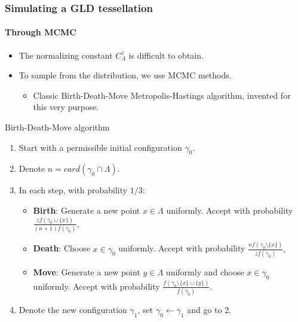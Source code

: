 \documentclass[c, 10pt]{beamer}
\begin{document}
\begin{frame}\frametitle{Simulating a GLD tessellation}\framesubtitle{Through MCMC}

\begin{small}
\begin{itemize}
    \item The normalizing constant $C^{z}_\Lambda$ is difficult to obtain.
    \item To sample from the distribution, we use MCMC methods.
    \begin{itemize}
        \item Classic Birth-Death-Move Metropolis-Hastings algorithm, invented for this very purpose.
    \end{itemize} 
\end{itemize}


Birth-Death-Move algorithm
\begin{enumerate}
    \item Start with a permissible initial configuration $\gamma_0$. 
    \item Denote $n=card(\gamma_0\cap \Lambda)$.
    \item In each step, with probability $1/3$:
    \begin{itemize}
        \item \textbf{Birth}: Generate a new point $x \in \Lambda$ uniformly. Accept with probability  $ \frac{z f(\gamma_0 \cup \{x\})}{(n+1)f(\gamma_0)},$
        \item \textbf{Death}: Choose $x\in\gamma_0$ uniformly. Accept with probability $ \frac{n f(\gamma_0 \setminus \{x\})}{zf(\gamma_0)},$
        \item \textbf{Move}: Generate a new point $y \in \Lambda$ uniformly and choose $x\in\gamma_0$ uniformly. Accept with probability $ \frac{f(\gamma_0 \setminus \{x\} \cup \{y\})}{f(\gamma_0)}.$
    \end{itemize}
    \item Denote the new configuration $\gamma_1$, set $\gamma_0 \leftarrow \gamma_1$ and go to 2.

\end{enumerate}

\end{small}
\end{frame}
 
\end{document}
